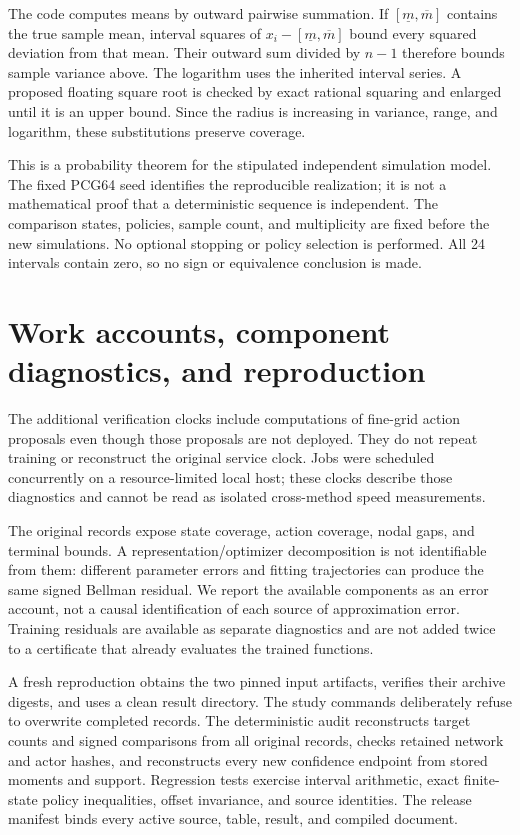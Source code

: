 \documentclass[ecta,nameyear,draft]{econsocart}
\begin{document}
The code computes means by outward pairwise summation. If $[\underline m,\overline m]$ contains the true sample mean, interval squares of $x_i-[\underline m,\overline m]$ bound every squared deviation from that mean. Their outward sum divided by $n-1$ therefore bounds sample variance above. The logarithm uses the inherited interval series. A proposed floating square root is checked by exact rational squaring and enlarged until it is an upper bound. Since the radius is increasing in variance, range, and logarithm, these substitutions preserve coverage.

This is a probability theorem for the stipulated independent simulation model. The fixed PCG64 seed identifies the reproducible realization; it is not a mathematical proof that a deterministic sequence is independent. The comparison states, policies, sample count, and multiplicity are fixed before the new simulations. No optional stopping or policy selection is performed. All 24 intervals contain zero, so no sign or equivalence conclusion is made.



\section{Work accounts, component diagnostics, and reproduction}

The additional verification clocks include computations of fine-grid action proposals even though those proposals are not deployed. They do not repeat training or reconstruct the original service clock. Jobs were scheduled concurrently on a resource-limited local host; these clocks describe those diagnostics and cannot be read as isolated cross-method speed measurements.

The original records expose state coverage, action coverage, nodal gaps, and terminal bounds. A representation/optimizer decomposition is not identifiable from them: different parameter errors and fitting trajectories can produce the same signed Bellman residual. We report the available components as an error account, not a causal identification of each source of approximation error. Training residuals are available as separate diagnostics and are not added twice to a certificate that already evaluates the trained functions.

A fresh reproduction obtains the two pinned input artifacts, verifies their archive digests, and uses a clean result directory. The study commands deliberately refuse to overwrite completed records. The deterministic audit reconstructs target counts and signed comparisons from all original records, checks retained network and actor hashes, and reconstructs every new confidence endpoint from stored moments and support. Regression tests exercise interval arithmetic, exact finite-state policy inequalities, offset invariance, and source identities. The release manifest binds every active source, table, result, and compiled document.
\end{document}
